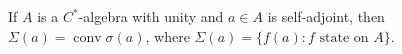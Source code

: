 If $A$ is a $C^*$-algebra with unity and $a \in A$ is self-adjoint, then $\Sigma(a) = \operatorname{conv} \sigma(a)$, where $\Sigma(a) = \{f(a) : f \text{ state on } A\}$.
